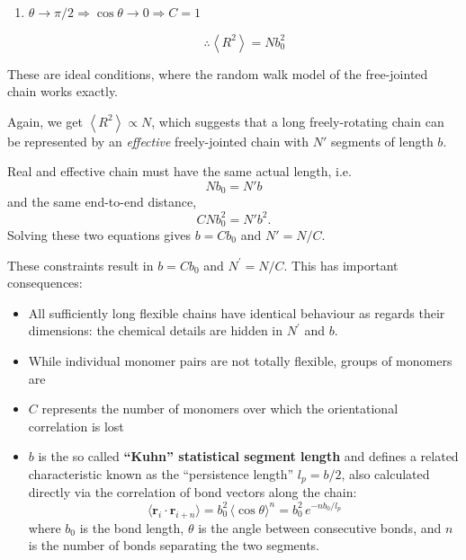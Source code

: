 \documentclass[
  letterpaper,
  enabledeprecatedfontcommands]{report}
\providecommand{\tightlist}{%
  \setlength{\itemsep}{0pt}\setlength{\parskip}{0pt}}
\begin{document}
\begin{enumerate}
\def\labelenumi{\arabic{enumi}.}
\setcounter{enumi}{2}
\tightlist
\item
  \(\theta \rightarrow \pi / 2 \Rightarrow \cos \theta \rightarrow 0 \Rightarrow C=1\)

  \[
  \therefore\left\langle R^{2}\right\rangle=N b_{0}^{2}\]
\end{enumerate}

These are ideal conditions, where the random walk model of the
free-jointed chain works exactly.

Again, we get \(\left\langle R^{2}\right\rangle \propto N\), which
suggests that a long freely-rotating chain can be represented by an
\emph{effective} freely-jointed chain with \(N'\) segments of length
\(b\).


Real and effective chain must have the same actual length, i.e. \[
N b_0 = N' b
\] and the same end-to-end distance, \[
C N b_0^2 = N' b^2.
\] Solving these two equations gives \(b = C b_0\) and \(N' = N / C\).

These constraints result in \(b=C b_{0}\) and \(N^{\prime}=N / C\). This
has important consequences:

\begin{itemize}
\tightlist
\item
  All sufficiently long flexible chains have identical behaviour as
  regards their dimensions: the chemical details are hidden in
  \(N^{\prime}\) and \(b.\)
\item
  While individual monomer pairs are not totally flexible, groups of
  monomers are
\item
  \(C\) represents the number of monomers over which the orientational
  correlation is lost
\item
  \(b\) is the so called \textbf{``Kuhn'' statistical segment length}
  and defines a related characteristic known as the ``persistence
  length'' \(l_{p}=b/2\), also calculated directly via the correlation
  of bond vectors along the chain: \[
  \langle \mathbf{r}_i \cdot \mathbf{r}_{i+n} \rangle = b_0^2 \, \langle \cos \theta \rangle^n = b_0^2 \, e^{-n b_0 / l_p}
  \] where \(b_0\) is the bond length, \(\theta\) is the angle between
  consecutive bonds, and \(n\) is the number of bonds separating the two
  segments.
\end{itemize}
\end{document}
